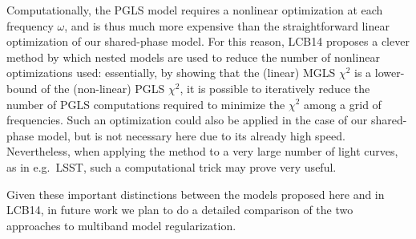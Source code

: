 \documentclass{emulateapj}
\begin{document}
Computationally, the PGLS model requires a nonlinear optimization at each frequency $\omega$, and is thus much more expensive than the straightforward linear optimization of our shared-phase model.
For this reason, LCB14 proposes a clever method by which nested models are used to reduce the number of nonlinear optimizations used: essentially, by showing that the (linear) MGLS $\chi^2$ is a lower-bound of the (non-linear) PGLS $\chi^2$, it is possible to iteratively reduce the number of PGLS computations required to minimize the $\chi^2$ among a grid of frequencies.
Such an optimization could also be applied in the case of our shared-phase model, but is not necessary here due to its already high speed.
Nevertheless, when applying the method to a very large number of light curves, as in e.g.~LSST, such a computational trick may prove very useful.

Given these important distinctions between the models proposed here and in LCB14, in future work we plan to do a detailed comparison of the two approaches to multiband model regularization.
\end{document}
